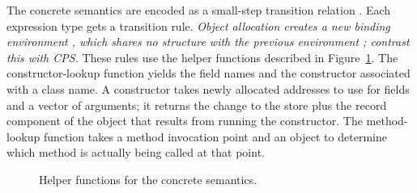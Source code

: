 The concrete semantics are encoded as a small-step transition relation
.
Each expression type gets a transition rule.
\emph{Object allocation creates a new binding environment
  , which shares no structure with the previous environment
  ; contrast this with CPS.}
These rules use the helper functions described in
Figure~\ref{fig:concrete-anfw-java-helper}.
The constructor-lookup function  yields the field names
and the constructor associated with a class name.
A constructor  takes newly allocated addresses to use for
fields and a vector of arguments; it returns the change to the store
plus the record component of the object that results from running the
constructor.
The method-lookup function  takes a method invocation point and an
object to determine which method is actually being called at that
point.



\begin{figure}
  \begin{small}\end{small}


  \caption{Helper functions for the concrete semantics.}
  \label{fig:concrete-anfw-java-helper}
\end{figure}





